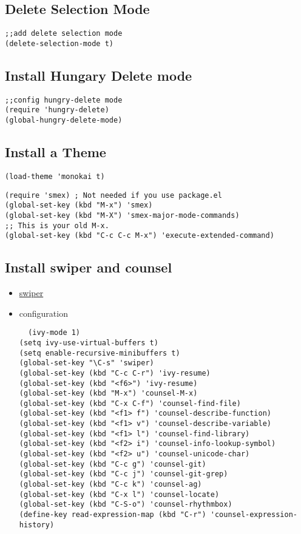 \documentclass[11pt]{article}
\begin{document}
\subsection{Delete Selection Mode}
\label{sec:org2257caf}
\begin{verbatim}
;;add delete selection mode
(delete-selection-mode t)
\end{verbatim}

\subsection{Install Hungary Delete mode}
\label{sec:org5146e9f}
\begin{verbatim}
;;config hungry-delete mode
(require 'hungry-delete)
(global-hungry-delete-mode)
\end{verbatim}
\subsection{Install a Theme}
\label{sec:org1f181fb}
\begin{verbatim}
(load-theme 'monokai t)
\end{verbatim}

\begin{verbatim}
(require 'smex) ; Not needed if you use package.el
(global-set-key (kbd "M-x") 'smex)
(global-set-key (kbd "M-X") 'smex-major-mode-commands)
;; This is your old M-x.
(global-set-key (kbd "C-c C-c M-x") 'execute-extended-command)
\end{verbatim}
\subsection{Install swiper and counsel}
\label{sec:org7a0dca9}
\begin{itemize}
\item \href{https://github.com/abo-abo/swiper}{swiper}
\item configuration  
\begin{verbatim}
  (ivy-mode 1)
(setq ivy-use-virtual-buffers t)
(setq enable-recursive-minibuffers t)
(global-set-key "\C-s" 'swiper)
(global-set-key (kbd "C-c C-r") 'ivy-resume)
(global-set-key (kbd "<f6>") 'ivy-resume)
(global-set-key (kbd "M-x") 'counsel-M-x)
(global-set-key (kbd "C-x C-f") 'counsel-find-file)
(global-set-key (kbd "<f1> f") 'counsel-describe-function)
(global-set-key (kbd "<f1> v") 'counsel-describe-variable)
(global-set-key (kbd "<f1> l") 'counsel-find-library)
(global-set-key (kbd "<f2> i") 'counsel-info-lookup-symbol)
(global-set-key (kbd "<f2> u") 'counsel-unicode-char)
(global-set-key (kbd "C-c g") 'counsel-git)
(global-set-key (kbd "C-c j") 'counsel-git-grep)
(global-set-key (kbd "C-c k") 'counsel-ag)
(global-set-key (kbd "C-x l") 'counsel-locate)
(global-set-key (kbd "C-S-o") 'counsel-rhythmbox)
(define-key read-expression-map (kbd "C-r") 'counsel-expression-history)
\end{verbatim}
\end{itemize}
\end{document}
